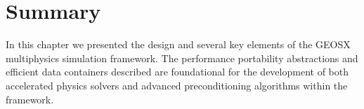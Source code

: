 \section{Summary}
\label{sec:geosx_summary}

In this chapter we presented the design and several key elements of the GEOSX multiphysics simulation framework.   The performance portability abstractions and efficient data containers described are foundational for the development of both accelerated physics solvers and advanced preconditioning algorithms within the framework.   